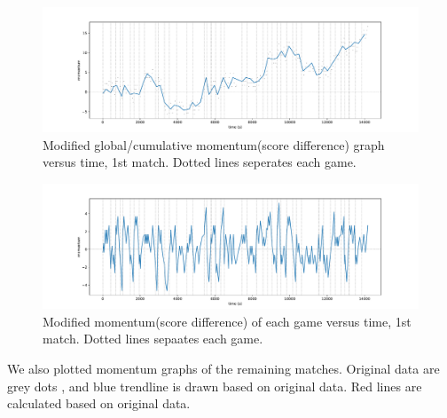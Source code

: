 \documentclass[11pt,a4paper]{article}
\begin{document}
	\begin{figure}[H]
		\centering
		\includegraphics[width=1.0\linewidth]{pics/fig2_0}
		\caption{Modified global/cumulative momentum(score difference) graph versus time, 1st match. Dotted lines seperates each game.}
		\label{fig:fig2_0}
	\end{figure}
	
	\begin{figure}[H]
		\centering
		\includegraphics[width=1.0\linewidth]{pics/fig3_0}
		\caption{Modified momentum(score difference) of each game versus time, 1st match. Dotted lines sepaates each game.}
		\label{fig:fig30}
	\end{figure}
	
	We also plotted momentum graphs of the remaining matches. Original data are \color{gray} grey dots \color{black}, and \color{blue}blue trendline \color{black}is drawn based on original data. \color{red} Red lines \color{black} are calculated based on original data.
	
\end{document}
